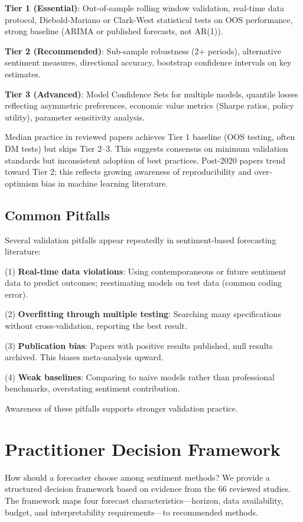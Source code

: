 \documentclass[11pt]{article}
\begin{document}
\textbf{Tier 1 (Essential)}: Out-of-sample rolling window validation, real-time data protocol, Diebold-Mariano or Clark-West statistical tests on OOS performance, strong baseline (ARIMA or published forecasts, not AR(1)).

\textbf{Tier 2 (Recommended)}: Sub-sample robustness (2+ periods), alternative sentiment measures, directional accuracy, bootstrap confidence intervals on key estimates.

\textbf{Tier 3 (Advanced)}: Model Confidence Sets for multiple models, quantile losses reflecting asymmetric preferences, economic value metrics (Sharpe ratios, policy utility), parameter sensitivity analysis.

Median practice in reviewed papers achieves Tier 1 baseline (OOS testing, often DM tests) but skips Tier 2--3. This suggests consensus on minimum validation standards but inconsistent adoption of best practices. Post-2020 papers trend toward Tier 2; this reflects growing awareness of reproducibility and over-optimism bias in machine learning literature.

\subsection{Common Pitfalls}

Several validation pitfalls appear repeatedly in sentiment-based forecasting literature:

\noindent
(1) \textbf{Real-time data violations}: Using contemporaneous or future sentiment data to predict outcomes; reestimating models on test data (common coding error). 

\noindent
(2) \textbf{Overfitting through multiple testing}: Searching many specifications without cross-validation, reporting the best result.

\noindent
(3) \textbf{Publication bias}: Papers with positive results published, null results archived. This biases meta-analysis upward.

\noindent
(4) \textbf{Weak baselines}: Comparing to naive models rather than professional benchmarks, overstating sentiment contribution.

Awareness of these pitfalls supports stronger validation practice.

\section{Practitioner Decision Framework}

How should a forecaster choose among sentiment methods? We provide a structured decision framework based on evidence from the 66 reviewed studies. The framework maps four forecast characteristics---horizon, data availability, budget, and interpretability requirements---to recommended methods.
\end{document}
